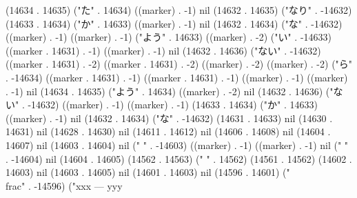 (14634 . 14635) ("た" . 14634) ((marker) . -1) nil (14632 . 14635) ("なり" . -14632) (14633 . 14634) ("か" . 14633) ((marker) . -1) nil (14632 . 14634) ("な" . -14632) ((marker) . -1) ((marker) . -1) ("よう" . 14633) ((marker) . -2) ("い" . -14633) ((marker . 14631) . -1) ((marker) . -1) nil (14632 . 14636) ("ない" . -14632) ((marker . 14631) . -2) ((marker . 14631) . -2) ((marker) . -2) ((marker) . -2) ("ら" . -14634) ((marker . 14631) . -1) ((marker . 14631) . -1) ((marker) . -1) ((marker) . -1) nil (14634 . 14635) ("よう" . 14634) ((marker) . -2) nil (14632 . 14636) ("ない" . -14632) ((marker) . -1) ((marker) . -1) (14633 . 14634) ("か" . 14633) ((marker) . -1) nil (14632 . 14634) ("な" . -14632) (14631 . 14633) nil (14630 . 14631) nil (14628 . 14630) nil (14611 . 14612) nil (14606 . 14608) nil (14604 . 14607) nil (14603 . 14604) nil ("
" . -14603) ((marker) . -1) ((marker) . -1) nil (" " . -14604) nil (14604 . 14605) (14562 . 14563) (" " . 14562) (14561 . 14562) (14602 . 14603) nil (14603 . 14605) nil (14601 . 14603) nil (14596 . 14601) ("\\frac" . -14596) ("xxx
---
yyy
